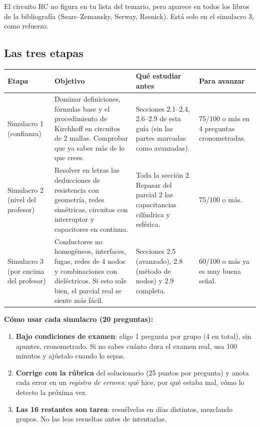 \documentclass[11pt]{article}
\begin{document}
{\footnotesize *El circuito RC no figura en tu lista del temario, pero aparece en todos los libros de la bibliografía (Sears--Zemansky, Serway, Resnick). Está solo en el simulacro 3, como refuerzo.}

\subsection{Las tres etapas}
\begin{center}
\small
\begin{tabularx}{\linewidth}{@{}p{2.3cm}XXp{2.6cm}@{}}
\toprule
\textbf{Etapa} & \textbf{Objetivo} & \textbf{Qué estudiar antes} & \textbf{Para avanzar}\\
\midrule
Simulacro 1 \newline (confianza) & Dominar definiciones, fórmulas base y el procedimiento de Kirchhoff en circuitos de 2 mallas. Comprobar que ya sabes más de lo que crees. & Secciones 2.1--2.4, 2.6--2.9 de esta guía (sin las partes marcadas como avanzadas). & 75/100 o más en 4 preguntas cronometradas.\\
\midrule
Simulacro 2 \newline (nivel del profesor) & Resolver en letras las deducciones de resistencia con geometría, redes simétricas, circuitos con interruptor y capacitores en continua. & Toda la sección 2. Repasar del parcial 2 las capacitancias cilíndrica y esférica. & 75/100 o más.\\
\midrule
Simulacro 3 \newline (por encima del profesor) & Conductores no homogéneos, interfaces, fugas, redes de 4 nodos y combinaciones con dieléctricos. Si esto sale bien, el parcial real se siente más fácil. & Secciones 2.5 (avanzado), 2.8 (método de nodos) y 2.9 completa. & 60/100 o más ya es muy buena señal.\\
\bottomrule
\end{tabularx}
\end{center}

\textbf{Cómo usar cada simulacro (20 preguntas):}
\begin{enumerate}
\item \textbf{Bajo condiciones de examen}: elige 1 pregunta por grupo (4 en total), sin apuntes, cronometrado. Si no sabes cuánto dura el examen real, usa 100 minutos y ajústalo cuando lo sepas.
\item \textbf{Corrige con la rúbrica} del solucionario (25 puntos por pregunta) y anota cada error en un \emph{registro de errores}: qué hice, por qué estaba mal, cómo lo detecto la próxima vez.
\item \textbf{Las 16 restantes son tarea}: resuélvelas en días distintos, mezclando grupos. No las leas resueltas antes de intentarlas.
\end{enumerate}
\end{document}
